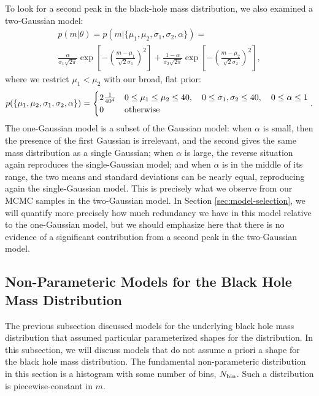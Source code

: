 \documentclass[preprint]{aastex}
\newcommand{\Nbin}{N_{\textnormal{bin}}}
\begin{document}
To look for a second peak in the black-hole mass distribution, we also
examined a two-Gaussian model:
\begin{multline}
  p(m|\theta) = p(m|\{\mu_1, \mu_2, \sigma_1, \sigma_2, \alpha\}) = \\
  \frac{\alpha}{\sigma_1 \sqrt{2\pi}} \exp\left[ - \left( \frac{m -
        \mu_1}{\sqrt{2}\sigma_1} \right)^2 \right] + \frac{1-\alpha}{\sigma_2 \sqrt{2\pi}} \exp\left[ - \left( \frac{m -
        \mu_2}{\sqrt{2}\sigma_2} \right)^2 \right],
\end{multline}
where we restrict $\mu_1 < \mu_2$ with our broad, flat prior:
\begin{equation}
  p(\{\mu_1, \mu_2, \sigma_1, \sigma_2, \alpha\}) = 
  \begin{cases}
    2 \frac{1}{40^4} & 0 \leq \mu_1 \leq \mu_2 \leq 40,
    \quad 0 \leq \sigma_1, \sigma_2 \leq 40, \quad 0 \leq \alpha \leq
    1 \\
    0 & \textnormal{otherwise}
  \end{cases}.
\end{equation}
The one-Gaussian model is a subset of the Gaussian model: when
$\alpha$ is small, then the presence of the first Gaussian is
irrelevant, and the second gives the same mass distribution as a
single Gaussian; when $\alpha$ is large, the reverse situation again
reproduces the single-Gaussian model; and when $\alpha$ is in the
middle of its range, the two means and standard deviations can be
nearly equal, reproducing again the single-Gaussian model.  This is
precisely what we observe from our MCMC samples in the two-Gaussian
model.  In Section \ref{sec:model-selection}, we will quantify more
precisely how much redundancy we have in this model relative to the
one-Gaussian model, but we should emphasize here that there is no
evidence of a significant contribution from a second peak in the
two-Gaussian model.

\subsection{Non-Parameteric Models for the Black Hole Mass Distribution}
\label{subsec:non-parameteric-models}

The previous subsection discussed models for the underlying black hole
mass distribution that assumed particular parameterized shapes for the
distribution.  In this subsection, we will discuss models that do not
assume a priori a shape for the black hole mass distribution.  The
fundamental non-parameteric distribution in this section is a
histogram with some number of bins, $\Nbin$.  Such a distribution is
piecewise-constant in $m$.
\end{document}
